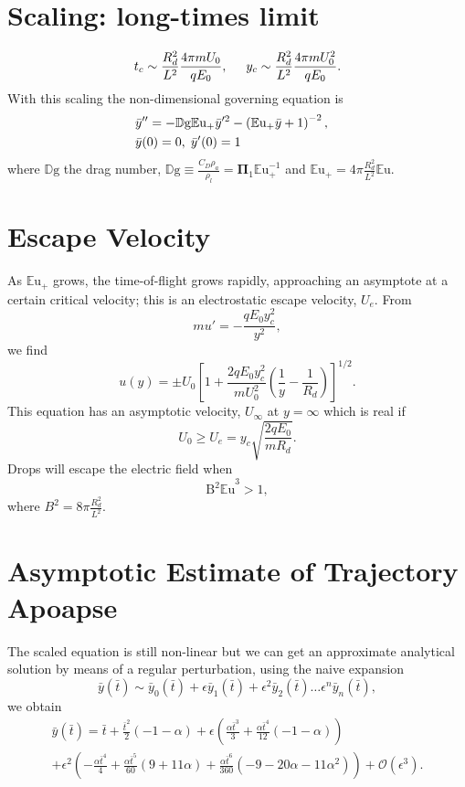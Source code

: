 \documentclass[10pt,a4paper]{article}
\begin{document}
\section*{Scaling: long-times limit}
\[ t_c \sim \frac{R_d^2}{L^2} \frac{4 \pi m U_0}{q E_0}, \hspace{5mm} y_c \sim \frac{R_d^2}{L^2} \frac{4 \pi m U_0^2}{q E_0}.
\]
With this scaling the non-dimensional governing equation is 
\begin{eqnarray*}
&\bar{y}'' = - \mathbb{D}\mbox{g} \mathbb{E}\mbox{u}_+ \bar{y}'^2 - \left( \mathbb{E}\mbox{u}_+ \bar{y} + 1 \right)^{-2}, & \nonumber \\
& \bar{y}(0) = 0, \hspace{1 mm} \bar{y}'(0) = 1 & \label{drag_limit}
\end{eqnarray*}
where $\mathbb{D}\mbox{g}$ the drag number, $\mathbb{D}\mbox{g} \equiv \frac{C_D \rho_a}{\rho_l} = \mathbf{\Pi}_1 {\mathbb{E}\mbox{u}}_+^{-1}$ and $\mathbb{E}\mbox{u}_+ = 4 \pi \frac{R_d^2}{L^2} \mathbb{E}\mbox{u}$.

\newpage
\section*{Escape Velocity}
As ${\mathbb{E}\mbox{u}}_+$ grows, the time-of-flight grows rapidly, approaching an asymptote at a certain critical velocity; this is an electrostatic escape velocity, $U_e$. From
\[ m u' = - \frac{q E_0 y_c^2}{y^2}, \]
we find
\[ u(y) = \pm U_0 \left[1 + \frac{2q E_0 y_c^2}{m U_0^2} \left( \frac{1}{y} - \frac{1}{R_d} \right) \right]^{1/2}.
\]
This equation has an asymptotic velocity, $U_{\infty}$ at $y = \infty$ which is real if 
\[ U_0 \geq  U_e = y_c \sqrt{\frac{2 q E_0 }{m R_d}}.
\]
Drops will escape the electric field when
\begin{equation*}\label{escape}
{\mbox{B}^2 \mathbb{E}\mbox{u}}^3 > 1,
\end{equation*}
where $B^2= 8 \pi\frac{ R_d^2}{L^2}$.
\newpage
\section*{Asymptotic Estimate of Trajectory Apoapse}
The scaled equation is still non-linear but we can get an approximate analytical solution by means of a regular perturbation, using the naive expansion
\[ \bar{y}(\bar{t}) \sim \bar{y}_0(\bar{t}) + \epsilon \bar{y}_1(\bar{t}) + \epsilon^2 \bar{y}_2(\bar{t}) \ldots \epsilon^n\bar{y}_n(\bar{t})  
,\]
we obtain
\begin{eqnarray*}
&\bar{y}(\bar{t}) = \bar{t} + \frac{\bar{t}^{2}}{2} \left(-1 - \alpha\right) + \epsilon \left(\frac{\alpha \bar{t}^{3}}{3} + \frac{\alpha \bar{t}^{4}}{12} \left(-1 - \alpha\right)\right)& \\
&+ \epsilon^{2} \left(- \frac{\alpha \bar{t}^{4}}{4} + \frac{\alpha \bar{t}^{5}}{60} \left(9 + 11 \alpha\right) + \frac{\alpha \bar{t}^{6}}{360} \left(-9 - 20 \alpha - 11 \alpha^{2}\right)\right) + \mathcal{O}(\epsilon^3).&
\end{eqnarray*}
\end{document}
